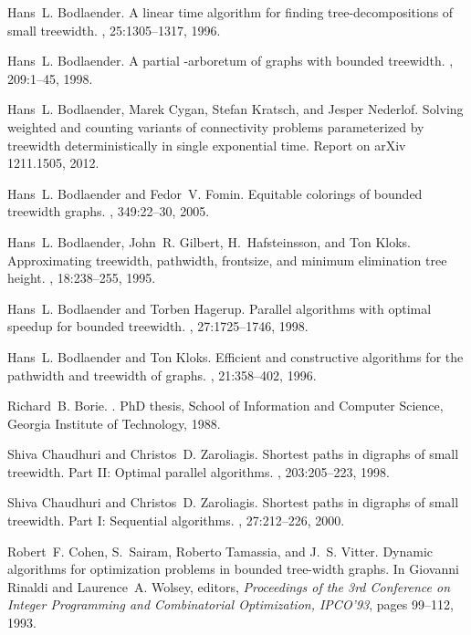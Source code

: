 \documentclass[a4paper,11pt]{article}
\theoremstyle{definition}
\theoremstyle{remark}
\begin{document}
\begin{thebibliography}{10}
Hans~L. Bodlaender.
\newblock A linear time algorithm for finding tree-decompositions of small
  treewidth.
, 25:1305--1317, 1996.

Hans~L. Bodlaender.
\newblock A partial -arboretum of graphs with bounded treewidth.
, 209:1--45, 1998.

Hans~L. Bodlaender, Marek Cygan, Stefan Kratsch, and Jesper Nederlof.
\newblock Solving weighted and counting variants of connectivity problems
  parameterized by treewidth deterministically in single exponential time.
\newblock Report on arXiv 1211.1505, 2012.

Hans~L. Bodlaender and Fedor~V. Fomin.
\newblock Equitable colorings of bounded treewidth graphs.
, 349:22--30, 2005.

Hans~L. Bodlaender, John~R. Gilbert, H.~Hafsteinsson, and Ton Kloks.
\newblock Approximating treewidth, pathwidth, frontsize, and minimum
  elimination tree height.
, 18:238--255, 1995.

Hans~L. Bodlaender and Torben Hagerup.
\newblock Parallel algorithms with optimal speedup for bounded treewidth.
, 27:1725--1746, 1998.

Hans~L. Bodlaender and Ton Kloks.
\newblock Efficient and constructive algorithms for the pathwidth and treewidth
  of graphs.
, 21:358--402, 1996.

Richard~B. Borie.
.
\newblock PhD thesis, School of Information and Computer Science, Georgia
  Institute of Technology, 1988.

Shiva Chaudhuri and Christos~D. Zaroliagis.
\newblock Shortest paths in digraphs of small treewidth. {P}art {II}: {O}ptimal
  parallel algorithms.
, 203:205--223, 1998.

Shiva Chaudhuri and Christos~D. Zaroliagis.
\newblock Shortest paths in digraphs of small treewidth. {P}art {I}:
  {S}equential algorithms.
, 27:212--226, 2000.

Robert~F. Cohen, S.~Sairam, Roberto Tamassia, and J.~S. Vitter.
\newblock Dynamic algorithms for optimization problems in bounded tree-width
  graphs.
\newblock In Giovanni Rinaldi and Laurence~A. Wolsey, editors, {\em Proceedings
  of the 3rd Conference on Integer Programming and Combinatorial Optimization,
  IPCO'93}, pages 99--112, 1993.


\end{thebibliography}
\end{document}
